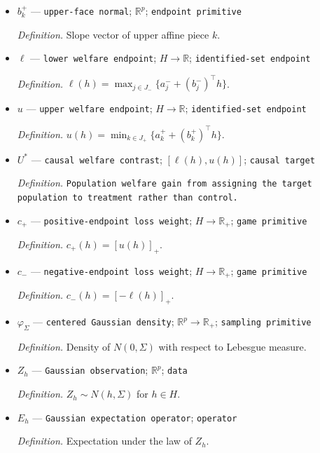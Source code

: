 \documentclass{article}
\begin{document}
\begin{itemize}
  \par\smallskip\noindent\emph{Definition.} Intercept of upper affine piece \(k\).
  \item \(b_k^{+}\) --- \texttt{upper-\allowbreak{}face normal}; \(\mathbb R^{p}\); \texttt{endpoint primitive}
  \par\smallskip\noindent\emph{Definition.} Slope vector of upper affine piece \(k\).
  \item \(\ell\) --- \texttt{lower welfare endpoint}; \(H\to\mathbb R\); \texttt{identified-\allowbreak{}set endpoint}
  \par\smallskip\noindent\emph{Definition.} \(\ell(h)=\max_{j\in J_{-}}\{a_j^{-}+(b_j^{-})^{\top}h\}\).
  \item \(u\) --- \texttt{upper welfare endpoint}; \(H\to\mathbb R\); \texttt{identified-\allowbreak{}set endpoint}
  \par\smallskip\noindent\emph{Definition.} \(u(h)=\min_{k\in J_{+}}\{a_k^{+}+(b_k^{+})^{\top}h\}\).
  \item \(U^{\ast}\) --- \texttt{causal welfare contrast}; \([\ell(h),u(h)]\); \texttt{causal target}
  \par\smallskip\noindent\emph{Definition.} \texttt{Population welfare gain from assigning the target population to treatment rather than control.}
  \item \(c_{+}\) --- \texttt{positive-\allowbreak{}endpoint loss weight}; \(H\to\mathbb R_{+}\); \texttt{game primitive}
  \par\smallskip\noindent\emph{Definition.} \(c_{+}(h)=[u(h)]_{+}\).
  \item \(c_{-}\) --- \texttt{negative-\allowbreak{}endpoint loss weight}; \(H\to\mathbb R_{+}\); \texttt{game primitive}
  \par\smallskip\noindent\emph{Definition.} \(c_{-}(h)=[-\ell(h)]_{+}\).
  \item \(\varphi_{\Sigma}\) --- \texttt{centered Gaussian density}; \(\mathbb R^{p}\to\mathbb R_{+}\); \texttt{sampling primitive}
  \par\smallskip\noindent\emph{Definition.} Density of \(N(0,\Sigma)\) with respect to Lebesgue measure.
  \item \(Z_h\) --- \texttt{Gaussian observation}; \(\mathbb R^{p}\); \texttt{data}
  \par\smallskip\noindent\emph{Definition.} \(Z_h\sim N(h,\Sigma)\) for \(h\in H\).
  \item \(E_h\) --- \texttt{Gaussian expectation operator}; \texttt{operator}
  \par\smallskip\noindent\emph{Definition.} Expectation under the law of \(Z_h\).

\end{itemize}
\end{document}
